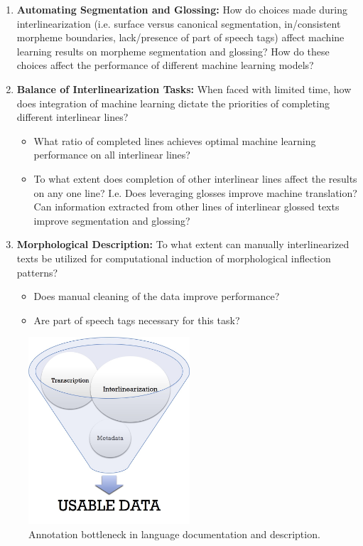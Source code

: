\begin{enumerate}
\item{} \textbf{Automating Segmentation and Glossing:} How do choices made during interlinearization (i.e. surface versus canonical segmentation, in/consistent morpheme boundaries, lack/presence of part of speech tags) affect machine learning results on morpheme segmentation and glossing? How do these choices affect the performance of different machine learning models?
\item{} \textbf{Balance of Interlinearization Tasks:} When faced with limited time, how does integration of machine learning dictate the priorities of completing different interlinear lines? 
    \begin{itemize}
        \item{} What ratio of completed lines achieves optimal machine learning performance on all interlinear lines?
        \item{} To what extent does completion of other interlinear lines affect the results on any one line? I.e.  Does leveraging glosses improve machine translation? Can information extracted from other lines of interlinear glossed texts improve segmentation and glossing?  
    \end{itemize}
\item{} \textbf{Morphological Description:} To what extent can manually interlinearized texts be utilized for computational induction of morphological inflection patterns? 
    \begin{itemize}
    \item{} Does manual cleaning of the data improve performance?
    \item{} Are part of speech tags necessary for this task?
    \end{itemize}
\end{enumerate}


\begin{figure}[h!]
    \centering
    \includegraphics[width=6cm]{figs/AnnotationFunnel.jpg}
    \caption[Annotation Bottleneck]{Annotation bottleneck in language documentation and description.}
    \label{fig:bottleneck}
\end{figure}

